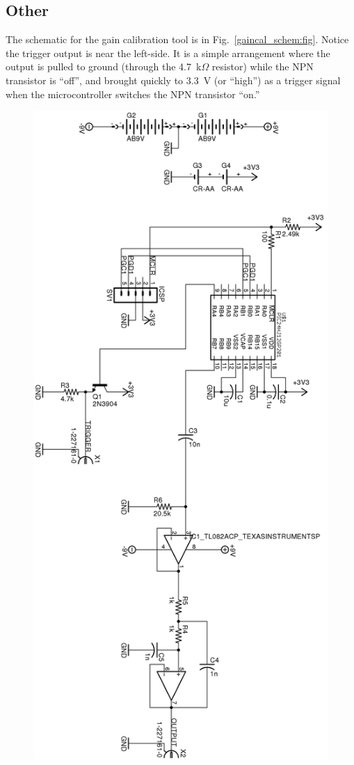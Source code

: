 \documentclass[letterpaper]{article}
\begin{document}
\subsection{Other}

The schematic for the gain calibration tool is in
Fig.~\ref{gaincal_schem:fig}. Notice the trigger output is near the
left-side. It is a simple arrangement where the output is pulled to
ground (through the 4.7~k$\Omega$ resistor) while the NPN transistor
is ``off'', and brought quickly to 3.3~V (or ``high'') as a trigger
signal when the microcontroller switches the NPN transistor ``on.''

\begin{figure}
\centering
\includegraphics[height=\textheight]{figures/gaincal_schematic.png}

\end{figure}
\end{document}
